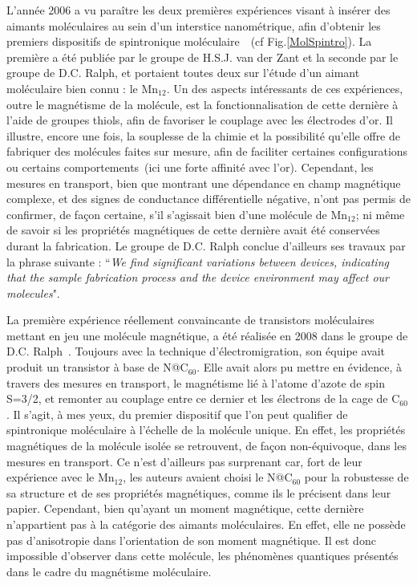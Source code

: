 L'année 2006 a vu paraître les deux premières expériences visant à insérer des aimants moléculaires au sein d'un interstice nanométrique, afin d'obtenir les premiers dispositifs de spintronique moléculaire~\cite{Heersche2006,Jo2006}~(cf Fig.\ref{MolSpintro}). La première a été publiée par le groupe de H.S.J. van der Zant et la seconde par le groupe de D.C. Ralph, et portaient toutes deux sur l'étude d'un aimant moléculaire bien connu : le Mn$_{12}$. Un des aspects intéressants de ces expériences, outre le magnétisme de la molécule, est la fonctionnalisation de cette dernière à l'aide de groupes thiols, afin de favoriser le couplage avec les électrodes d'or. Il illustre, encore une fois, la souplesse de la chimie et la possibilité qu'elle offre de fabriquer des molécules faites sur mesure, afin de faciliter certaines configurations ou certains comportements~(ici une forte affinité avec l'or).  
Cependant, les mesures en transport, bien que montrant une dépendance en champ magnétique complexe, et des signes de conductance différentielle négative, n'ont pas permis de confirmer, de façon certaine, s'il s'agissait bien d'une molécule de Mn$_{12}$; ni même de savoir si les propriétés magnétiques de cette dernière avait été conservées durant la fabrication. Le groupe de D.C. Ralph conclue d'ailleurs ses travaux par la phrase suivante : ``\textit{We find significant variations between devices, indicating that the sample fabrication process and the device environment may affect our molecules}".

La première expérience réellement convaincante de transistors moléculaires mettant en jeu une molécule magnétique, a été réalisée en 2008 dans le groupe de D.C. Ralph~\cite{Grose2008}. Toujours avec la technique d'électromigration, son équipe avait produit un transistor à base de N@C$_{60}$. Elle avait alors pu mettre en évidence, à travers des mesures en transport, le magnétisme lié à l'atome d'azote de spin S=3/2,  et remonter au couplage entre ce dernier et les électrons de la cage de C$_{60}$. 
Il s'agit, à mes yeux, du premier dispositif que l'on peut qualifier de spintronique moléculaire à l'échelle de la molécule unique. En effet, les propriétés magnétiques de la molécule isolée se retrouvent, de façon non-équivoque, dans les mesures en transport. Ce n'est d'ailleurs pas surprenant car, fort de leur expérience avec le Mn$_{12}$, les auteurs avaient choisi le N@C$_{60}$ pour la robustesse de sa structure et de ses propriétés magnétiques, comme ils le précisent dans leur papier.
Cependant, bien qu'ayant un moment magnétique, cette dernière n'appartient pas à la catégorie des aimants moléculaires. En effet, elle ne possède pas d'anisotropie dans l'orientation de son moment magnétique. Il est donc impossible d'observer dans cette molécule, les phénomènes quantiques présentés dans le cadre du magnétisme moléculaire.


